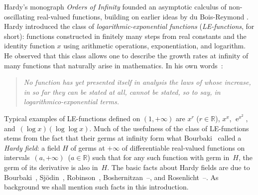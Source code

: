 \documentclass[]{amsart}
\numberwithin{equation}{section}
\newcommand{\bbold}{\mathbb}
\def\R { {\bbold R} }
\def \ex{\operatorname{e}}
\theoremstyle{definition}
\theoremstyle{remark}
\begin{document}
\noindent
Hardy's monograph \textit{Orders of Infinity}\/\cite{Ha} founded an
asymptotic calculus of non-oscillating real-valued functions, building on
earlier ideas by du Bois-Reymond \cite{dBR75}. Hardy introduced the class of 
{\it logarithmic-exponential functions} ({\it LE-functions}\/, for short):
functions constructed in finitely many steps from real constants and the identity function $x$ using arithmetic operations, exponentiation, and logarithm.
He observed that this class allows one to describe the growth rates at infinity of many functions that
naturally arise in mathematics. In his own words~\cite[p.~48]{Ha}:
\begin{quote}
{\it No function has yet presented itself in analysis the
laws of whose increase, in so far they can be stated at all, cannot be stated, so to
say, in logarithmico-exponential terms.}
\end{quote}
Typical examples of LE-functions defined on $(1, +\infty)$ are $x^r$ ($r \in \R$), $x^x$, $\ex^{x^2}$, 
and~$(\log x)(\log \log x)$.
Much of the usefulness of the class of LE-functions stems from the fact that their germs at
infinity form what Bourbaki~\cite{Bou}  called a {\it Hardy field}\/: a field $H$ of germs at $+\infty$ of differentiable real-valued functions on intervals~$(a,+\infty)$~($a\in\R$)
such that for any such function with germ in~$H$, the germ of its derivative is
also in~$H$. The basic facts about Hardy fields are due to
 Bourbaki~\cite{Bou}, Sj{\"o}din~\cite{Sj}, Robinson~\cite{Ro},  Boshernitzan~\cite{Boshernitzan81}--\cite{Boshernitzan87}, and Rosenlicht~\cite{Ros}--\cite{Rosenlicht95}. As background we shall mention such facts in this introduction. 
\end{document}
